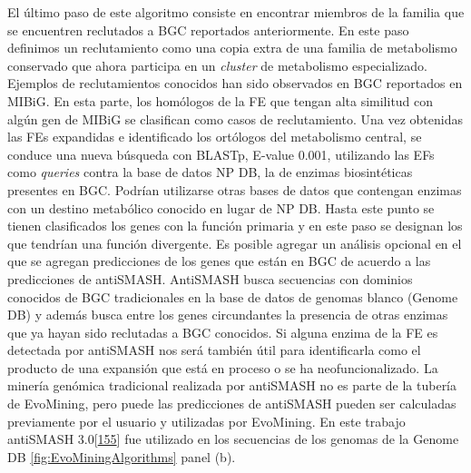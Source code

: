 \documentclass[12pt,twoside]{reedthesis}
\begin{document}
  El último paso de este algoritmo consiste en encontrar miembros de la
  familia que se encuentren reclutados a BGC reportados anteriormente. En
  este paso definimos un reclutamiento como una copia extra de una familia
  de metabolismo conservado que ahora participa en un \emph{cluster} de
  metabolismo especializado. Ejemplos de reclutamientos conocidos han sido
  observados en BGC reportados en MIBiG. En esta parte, los homólogos de
  la FE que tengan alta similitud con algún gen de MIBiG se clasifican
  como casos de reclutamiento. Una vez obtenidas las FEs expandidas e
  identificado los ortólogos del metabolismo central, se conduce una nueva
  búsqueda con BLASTp, E-value 0.001, utilizando las EFs como
  \emph{queries} contra la base de datos NP DB, la de enzimas
  biosintéticas presentes en BGC. Podrían utilizarse otras bases de datos
  que contengan enzimas con un destino metabólico conocido en lugar de NP
  DB. Hasta este punto se tienen clasificados los genes con la función
  primaria y en este paso se designan los que tendrían una función
  divergente. Es posible agregar un análisis opcional en el que se agregan
  predicciones de los genes que están en BGC de acuerdo a las predicciones
  de antiSMASH. AntiSMASH busca secuencias con dominios conocidos de BGC
  tradicionales en la base de datos de genomas blanco (Genome DB) y además
  busca entre los genes circundantes la presencia de otras enzimas que ya
  hayan sido reclutadas a BGC conocidos. Si alguna enzima de la FE es
  detectada por antiSMASH nos será también útil para identificarla como el
  producto de una expansión que está en proceso o se ha neofuncionalizado.
  La minería genómica tradicional realizada por antiSMASH no es parte de
  la tubería de EvoMining, pero puede las predicciones de antiSMASH pueden
  ser calculadas previamente por el usuario y utilizadas por EvoMining. En
  este trabajo antiSMASH
  3.0{[}\protect\hyperlink{ref-weber_antismash3_2015}{155}{]} fue
  utilizado en los secuencias de los genomas de la Genome DB
  \autoref{fig:EvoMiningAlgorithms} panel (b).
  
\end{document}
